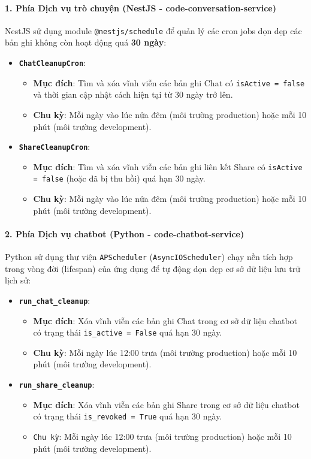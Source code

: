 \paragraph{1. Phía Dịch vụ trò chuyện (NestJS - code-conversation-service)}
NestJS sử dụng module \texttt{@nestjs/schedule} để quản lý các cron jobs dọn dẹp các bản ghi không còn hoạt động quá \textbf{30 ngày}:
\begin{itemize}
\item \textbf{\texttt{ChatCleanupCron}}:
\begin{itemize}
\item \textbf{Mục đích}: Tìm và xóa vĩnh viễn các bản ghi Chat có \texttt{isActive = false} và thời gian cập nhật cách hiện tại từ 30 ngày trở lên.
\item \textbf{Chu kỳ}: Mỗi ngày vào lúc nửa đêm (môi trường production) hoặc mỗi 10 phút (môi trường development).
\end{itemize}
\item \textbf{\texttt{ShareCleanupCron}}:
\begin{itemize}
\item \textbf{Mục đích}: Tìm và xóa vĩnh viễn các bản ghi liên kết Share có \texttt{isActive = false} (hoặc đã bị thu hồi) quá hạn 30 ngày.
\item \textbf{Chu kỳ}: Mỗi ngày vào lúc nửa đêm (môi trường production) hoặc mỗi 10 phút (môi trường development).
\end{itemize}
\end{itemize}

\paragraph{2. Phía Dịch vụ chatbot (Python - code-chatbot-service)}
Python sử dụng thư viện \texttt{APScheduler} (\texttt{AsyncIOScheduler}) chạy nền tích hợp trong vòng đời (lifespan) của ứng dụng để tự động dọn dẹp cơ sở dữ liệu lưu trữ lịch sử:
\begin{itemize}
\item \textbf{\texttt{run\_chat\_cleanup}}:
\begin{itemize}
\item \textbf{Mục đích}: Xóa vĩnh viễn các bản ghi Chat trong cơ sở dữ liệu chatbot có trạng thái \texttt{is\_active = False} quá hạn 30 ngày.
\item \textbf{Chu kỳ}: Mỗi ngày lúc 12:00 trưa (môi trường production) hoặc mỗi 10 phút (môi trường development).
\end{itemize}
\item \textbf{\texttt{run\_share\_cleanup}}:
\begin{itemize}
\item \textbf{Mục đích}: Xóa vĩnh viễn các bản ghi Share trong cơ sở dữ liệu chatbot có trạng thái \texttt{is\_revoked = True} quá hạn 30 ngày.
\item \texttt{Chu kỳ}: Mỗi ngày lúc 12:00 trưa (môi trường production) hoặc mỗi 10 phút (môi trường development).
\end{itemize}
\end{itemize}
